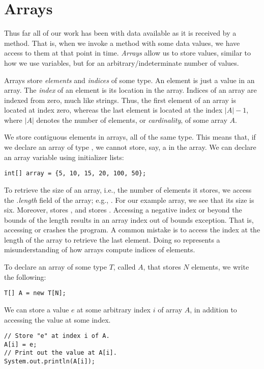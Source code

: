 \section{Arrays}

Thus far all of our work has been with data available as it is received by a method. That is, when we invoke a method with some data values, we have access to them at that point in time. \textit{Arrays} allow us to store values, similar to how we use variables, but for an arbitrary/indeterminate number of values.

Arrays store \textit{elements} and \textit{indices} of some type. An element is just a value in an array. The \textit{index} of an element is its location in the array. Indices of an array are indexed from zero, much like strings. Thus, the first element of an array is located at index zero, whereas the last element is located at the index $|A| - 1$, where $|A|$ denotes the number of elements, or \textit{cardinality}, of some array $A$.

We store contiguous elements in arrays, all of the same type. This means that, if we declare an array of type , we cannot store, say, a  in the array. We can declare an array variable using initializer lists:
\par{
\begin{verbatim}
int[] array = {5, 10, 15, 20, 100, 50};
\end{verbatim}
}
To retrieve the size of an array, i.e., the number of elements it stores, we access the \textit{.length} field of the array; e.g., . For our example array, we see that its size is six. Moreover,  stores , and  stores . Accessing a negative index or beyond the bounds of the length results in an array index out of bounds exception. That is, accessing  or  crashes the program. A common mistake is to access the index at the length of the array to retrieve the last element. Doing so represents a misunderstanding of how arrays compute indices of elements.

To declare an array of some type $T$, called $A$, that stores $N$ elements, we write the following:
\par{
\begin{verbatim}
T[] A = new T[N];
\end{verbatim}
}
We can store a value $e$ at some arbitrary index $i$ of array $A$, in addition to accessing the value at some index.
\par{
\begin{verbatim}
// Store "e" at index i of A.
A[i] = e;
// Print out the value at A[i].
System.out.println(A[i]);
\end{verbatim}
}


